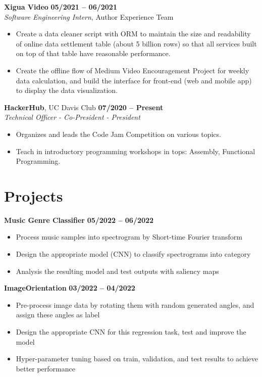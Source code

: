 \documentclass[margin,line]{res}
\begin{document}
\begin{resume}
{\bf Xigua Video} \hfill {\bf 05/2021 -- 06/2021} \\
\textit{Software Engineering Intern}, {Author Experience Team}
\begin{itemize}
	\item Create a data cleaner script with ORM to maintain the size and readability of online data settlement table (about 5 billion rows) so that all services built on top of that table have reasonable performance.
	\item Create the offline flow of Medium Video Encouragement Project for weekly data calculation, and build the interface for front-end (web and mobile app) to display the data visualization.
\end{itemize}
\vspace{-.3cm}

{\bf HackerHub}, UC Davis Club \hfill {\bf 07/2020 -- Present} \\
\textit{Technical Officer - Co-President - President}
\begin{itemize}
	\item Organizes and leads the Code Jam Competition on various topics.
	\item Teach in introductory programming workshops in tops: Assembly, Functional Programming.
\end{itemize}
\vspace{-.3cm}

\section{\sc Projects}
{\bf Music Genre Classifier} \hfill {\bf 05/2022 -- 06/2022} \\
\begin{itemize}
	\item Process music samples into spectrogram by Short-time Fourier transform
	\item Design the appropriate model (CNN) to classify spectrograms into category
	\item Analysis the resulting model and test outputs with saliency maps
\end{itemize}
\vspace{-.3cm}

{\bf ImageOrientation} \hfill {\bf 03/2022 -- 04/2022} \\
\begin{itemize}
	\item Pre-process image data by rotating them with random generated angles, and assign these angles as label
	\item Design the appropriate CNN for this regression task, test and improve the model
	\item Hyper-parameter tuning based on train, validation, and test results to achieve better performance
\end{itemize}
\vspace{-.3cm}


\end{resume}
\end{document}
